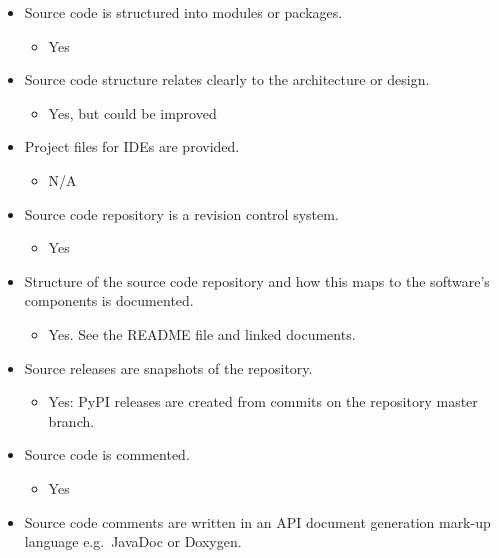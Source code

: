 \begin{itemize}
\itemsep1pt\parskip0pt
\item
  Source code is structured into modules or packages.

  \begin{itemize}
  \itemsep1pt\parskip0pt
  \item
    Yes
  \end{itemize}
\item
  Source code structure relates clearly to the architecture or design.

  \begin{itemize}
  \itemsep1pt\parskip0pt
  \item
    Yes, but could be improved
  \end{itemize}
\item
  Project files for IDEs are provided.

  \begin{itemize}
  \itemsep1pt\parskip0pt
  \item
    N/A
  \end{itemize}
\item
  Source code repository is a revision control system.

  \begin{itemize}
  \itemsep1pt\parskip0pt
  \item
    Yes
  \end{itemize}
\item
  Structure of the source code repository and how this maps to the
  software's components is documented.

  \begin{itemize}
  \itemsep1pt\parskip0pt
  \item
    Yes. See the README file and linked documents.
  \end{itemize}
\item
  Source releases are snapshots of the repository.

  \begin{itemize}
  \itemsep1pt\parskip0pt
  \item
    Yes: PyPI releases are created from commits on the repository master
    branch.
  \end{itemize}
\item
  Source code is commented.

  \begin{itemize}
  \itemsep1pt\parskip0pt
  \item
    Yes
  \end{itemize}
\item
  Source code comments are written in an API document generation mark-up
  language e.g.~JavaDoc or Doxygen.


\end{itemize}
